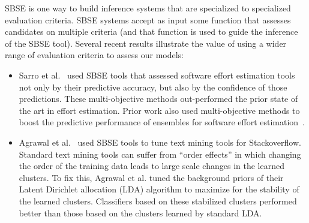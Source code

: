 \documentclass[sigconf,anonymous,review]{acmart}
\begin{document}
SBSE is one way to build inference systems that are specialized to specialized evaluation
criteria. SBSE systems accept as input some function that assesses candidates on multiple
criteria (and that function is used to   guide the inference of the SBSE tool).
Several recent results illustrate the value of using a wider range of evaluation criteria
to assess our models:
\begin{itemize}[leftmargin=*]
\item
Sarro et al.~\cite{sarro2016multi}  used SBSE tools that assessed software effort estimation tools
not only by their predictive accuracy, but also by the confidence of those predictions.
These multi-objective methods out-performed the prior state of the art in effort estimation. 
{Prior work also used multi-objective methods to boost the predictive performance of ensembles for
software effort estimation~\cite{minku2013}.}
\item
Agrawal et al.~\cite{agrawalwrong} used SBSE tools to tune text mining tools for Stackoverflow.
Standard text mining tools can suffer from ``order effects'' in which changing the order
of the training data leads to large scale changes in the learned clusters.
To fix this, Agrawal et al. tuned the background priors
of their Latent Dirichlet allocation (LDA) algorithm to maximize for the stability
of the learned clusters.  Classifiers based on these stabilized clusters performed better than those based on the clusters learned by standard LDA.
\end{itemize}




\end{document}
